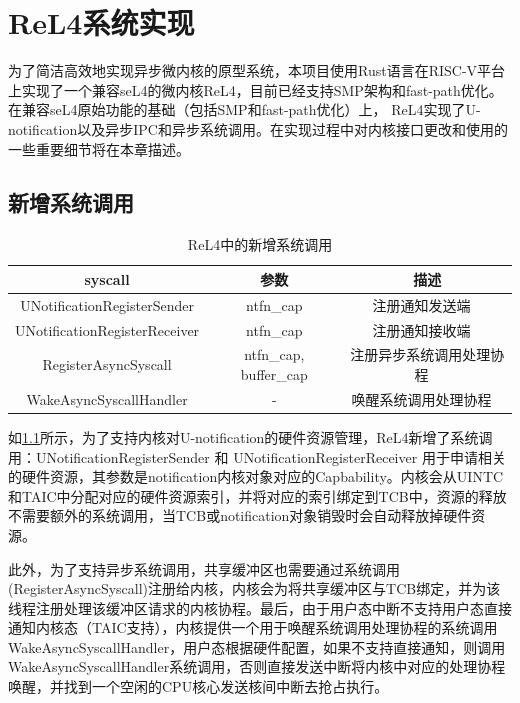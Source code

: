 \chapter{ReL4系统实现}
\label{chap:ReL4_impl}

为了简洁高效地实现异步微内核的原型系统，本项目使用Rust语言在RISC-V平台上实现了一个兼容seL4的微内核ReL4，目前已经支持SMP架构和fast-path优化。在兼容seL4原始功能的基础（包括SMP和fast-path优化）上， ReL4实现了U-notification以及异步IPC和异步系统调用。在实现过程中对内核接口更改和使用的一些重要细节将在本章描述。

\section{新增系统调用}

\begin{table}
    \centering
    \begin{tabular}{|c|c|c|}
        \hline 
        syscall & 参数 & 描述 \\
        \hline
        UNotificationRegisterSender & ntfn\_cap & 注册通知发送端 \ \\
        \hline
        UNotificationRegisterReceiver & ntfn\_cap & 注册通知接收端 \ \\
        \hline
        RegisterAsyncSyscall & ntfn\_cap, buffer\_cap & 注册异步系统调用处理协程 \ \\
        \hline
        WakeAsyncSyscallHandler & - & 唤醒系统调用处理协程 \ \\
        \hline
    \end{tabular}
    \caption{ReL4中的新增系统调用}
    \label{tab:new_syscall}
\end{table}

如\ref{tab:new_syscall}所示，为了支持内核对U-notification的硬件资源管理，ReL4新增了系统调用：UNotificationRegisterSender 和 UNotificationRegisterReceiver 用于申请相关的硬件资源，其参数是notification内核对象对应的Capbability。内核会从UINTC和TAIC中分配对应的硬件资源索引，并将对应的索引绑定到TCB中，资源的释放不需要额外的系统调用，当TCB或notification对象销毁时会自动释放掉硬件资源。

此外，为了支持异步系统调用，共享缓冲区也需要通过系统调用(RegisterAsyncSyscall)注册给内核，内核会为将共享缓冲区与TCB绑定，并为该线程注册处理该缓冲区请求的内核协程。最后，由于用户态中断不支持用户态直接通知内核态（TAIC支持），内核提供一个用于唤醒系统调用处理协程的系统调用WakeAsyncSyscallHandler，用户态根据硬件配置，如果不支持直接通知，则调用WakeAsyncSyscallHandler系统调用，否则直接发送中断将内核中对应的处理协程唤醒，并找到一个空闲的CPU核心发送核间中断去抢占执行。


